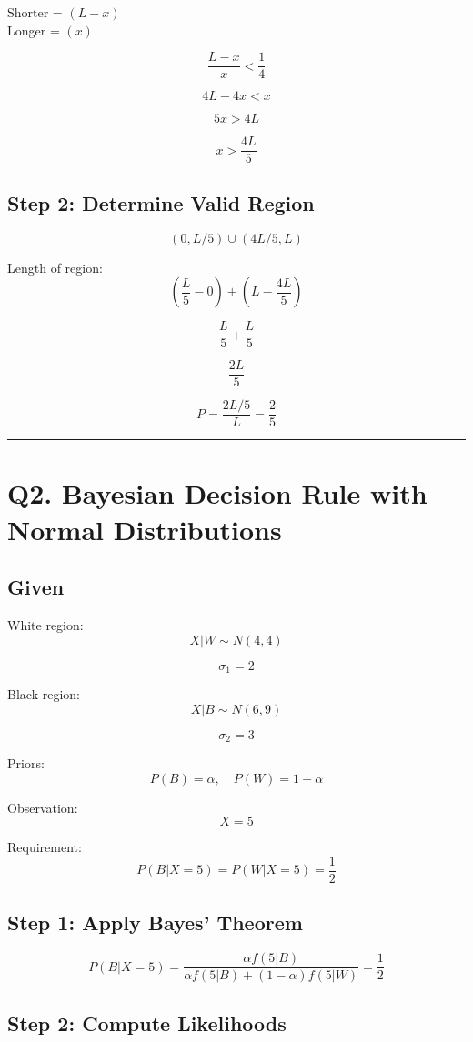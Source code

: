 \documentclass[12pt]{article}
\begin{document}
Shorter = $(L-x)$ \\
Longer = $(x)$

\[
\frac{L-x}{x} < \frac14
\]

\[
4L - 4x < x
\]

\[
5x > 4L
\]

\[
x > \frac{4L}{5}
\]

\subsection*{Step 2: Determine Valid Region}

\[
(0,L/5) \cup (4L/5,L)
\]

Length of region:
\[
\left(\frac{L}{5}-0\right) + \left(L-\frac{4L}{5}\right)
\]

\[
\frac{L}{5} + \frac{L}{5}
\]

\[
\frac{2L}{5}
\]

\[
P = \frac{2L/5}{L} = \frac{2}{5}
\]

\hrule
\vspace{1em}

\section*{Q2. Bayesian Decision Rule with Normal Distributions}

\subsection*{Given}

White region:
\[
X|W \sim N(4,4)
\]

\[
\sigma_1 = 2
\]

Black region:
\[
X|B \sim N(6,9)
\]

\[
\sigma_2 = 3
\]

Priors:
\[
P(B)=\alpha,\quad P(W)=1-\alpha
\]

Observation:
\[
X=5
\]

Requirement:
\[
P(B|X=5)=P(W|X=5)=\frac12
\]

\subsection*{Step 1: Apply Bayes’ Theorem}

\[
P(B|X=5)
=
\frac{\alpha f(5|B)}
{\alpha f(5|B)+(1-\alpha)f(5|W)}
=
\frac12
\]

\subsection*{Step 2: Compute Likelihoods}
\end{document}

